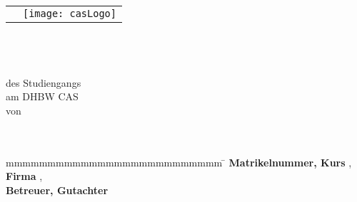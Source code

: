 \begin{titlepage}
	\begin{longtable}{p{8.2cm} p{5.4cm}}
		&
		\texttt{[image: casLogo]}
	\end{longtable}
	\enlargethispage{20mm}
	\begin{center}
		\vspace*{12mm}	{\LARGE\textbf \myTitel }\\
		\vspace*{12mm}	{\large\textbf \myArbeit}\\
		\vspace*{3mm}		{\textbf \myDegree}\\
		\vspace*{12mm}	des Studiengangs \myKurs\\
    \vspace*{3mm}		am DHBW CAS\\
		\vspace*{12mm}	von\\
		\vspace*{3mm}		{\large\textbf \myAutor}\\
		\vspace*{12mm}	\myDatum\\
	\end{center}
	\vfill
	\begin{spacing}{1.2}
	\begin{tabbing}
		mmmmmmmmmmmmmmmmmmmmmmmmmm             \= \kill
		\textbf{Matrikelnummer, Kurs}  \>  \myMatrikelnr, \myKurs\\
		\textbf{Firma}                  \>  \myFirma, \myFirmenort\\
		\textbf{Betreuer, Gutachter}               \>  \myBetreuer\\
	\end{tabbing}
	\end{spacing}
\end{titlepage}